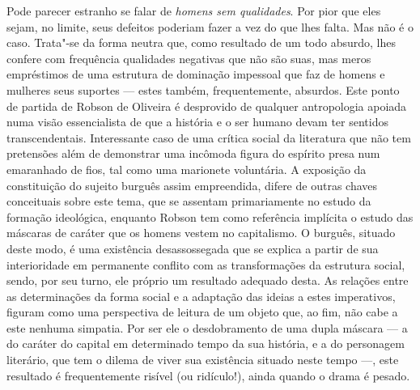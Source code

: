 Pode parecer estranho se falar de \emph{homens sem qualidades}. Por pior
que eles sejam, no limite, seus defeitos poderiam fazer a vez do que
lhes falta. Mas não é o caso. Trata"-se da forma neutra que, como
resultado de um todo absurdo, lhes confere com frequência qualidades
negativas que não são suas, mas meros empréstimos de uma estrutura de
dominação impessoal que faz de homens e mulheres seus suportes --- estes
também, frequentemente, absurdos. Este ponto de partida de Robson de
Oliveira é desprovido de qualquer antropologia apoiada numa visão
essencialista de que a história e o ser humano devam ter sentidos
transcendentais. Interessante caso de uma crítica social da literatura
que não tem pretensões além de demonstrar uma incômoda figura do
espírito presa num emaranhado de fios, tal como uma marionete
voluntária. A exposição da constituição do sujeito burguês assim
empreendida, difere de outras chaves conceituais sobre este tema, que se
assentam primariamente no estudo da formação ideológica, enquanto Robson
tem como referência implícita o estudo das máscaras de caráter que os
homens vestem no capitalismo. O burguês, situado deste modo, é uma
existência desassossegada que se explica a partir de sua interioridade
em permanente conflito com as transformações da estrutura social, sendo,
por seu turno, ele próprio um resultado adequado desta. As relações
entre as determinações da forma social e a adaptação das ideias a estes
imperativos, figuram como uma perspectiva de leitura de um objeto que,
ao fim, não cabe a este nenhuma simpatia. Por ser ele o desdobramento de
uma dupla máscara --- a do caráter do capital em determinado tempo da sua
história, e a do personagem literário, que tem o dilema de viver sua
existência situado neste tempo ---, este resultado é frequentemente
risível (ou ridículo!), ainda quando o drama é pesado.

